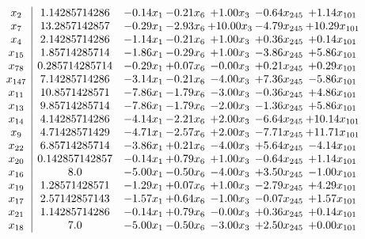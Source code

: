 \documentclass[8pt]{article}
\begin{document}
\[\begin{array}{c| c c@{\hskip 2pt} c@{\hskip 2pt} c@{\hskip 2pt} c@{\hskip 2pt} c@{\hskip 2pt} }
 x_{2}   &  1.14285714286 & -0.14 x_{1} & -0.21 x_{6} & +  1.00 x_{3} & -0.64 x_{245} & +  1.14 x_{101}\\
 x_{7}   &  13.2857142857 & -0.29 x_{1} & -2.93 x_{6} & + 10.00 x_{3} & -4.79 x_{245} & + 10.29 x_{101}\\
 x_{4}   &  2.14285714286 & -1.14 x_{1} & -0.21 x_{6} & +  1.00 x_{3} & +  0.36 x_{245} & +  0.14 x_{101}\\
 x_{15}   &  1.85714285714 & -1.86 x_{1} & -0.29 x_{6} & +  1.00 x_{3} & -3.86 x_{245} & +  5.86 x_{101}\\
 x_{78}   &  0.285714285714 & -0.29 x_{1} & +  0.07 x_{6} & -0.00 x_{3} & +  0.21 x_{245} & +  0.29 x_{101}\\
 x_{147}   &  7.14285714286 & -3.14 x_{1} & -0.21 x_{6} & -4.00 x_{3} & +  7.36 x_{245} & -5.86 x_{101}\\
 x_{11}   &  10.8571428571 & -7.86 x_{1} & -1.79 x_{6} & -3.00 x_{3} & -0.36 x_{245} & +  4.86 x_{101}\\
 x_{13}   &  9.85714285714 & -7.86 x_{1} & -1.79 x_{6} & -2.00 x_{3} & -1.36 x_{245} & +  5.86 x_{101}\\
 x_{14}   &  4.14285714286 & -4.14 x_{1} & -2.21 x_{6} & +  2.00 x_{3} & -6.64 x_{245} & + 10.14 x_{101}\\
 x_{9}   &  4.71428571429 & -4.71 x_{1} & -2.57 x_{6} & +  2.00 x_{3} & -7.71 x_{245} & + 11.71 x_{101}\\
 x_{22}   &  6.85714285714 & -3.86 x_{1} & +  0.21 x_{6} & -4.00 x_{3} & +  5.64 x_{245} & -4.14 x_{101}\\
 x_{20}   &  0.142857142857 & -0.14 x_{1} & +  0.79 x_{6} & +  1.00 x_{3} & -0.64 x_{245} & +  1.14 x_{101}\\
 x_{16}   &  8.0 & -5.00 x_{1} & -0.50 x_{6} & -4.00 x_{3} & +  3.50 x_{245} & -1.00 x_{101}\\
 x_{19}   &  1.28571428571 & -1.29 x_{1} & +  0.07 x_{6} & +  1.00 x_{3} & -2.79 x_{245} & +  4.29 x_{101}\\
 x_{17}   &  2.57142857143 & -1.57 x_{1} & +  0.64 x_{6} & -1.00 x_{3} & -0.07 x_{245} & +  1.57 x_{101}\\
 x_{21}   &  1.14285714286 & -0.14 x_{1} & +  0.79 x_{6} & -0.00 x_{3} & +  0.36 x_{245} & +  0.14 x_{101}\\
 x_{18}   &  7.0 & -5.00 x_{1} & -0.50 x_{6} & -3.00 x_{3} & +  2.50 x_{245} & +  0.00 x_{101}\\

\end{array}\]
\end{document}
